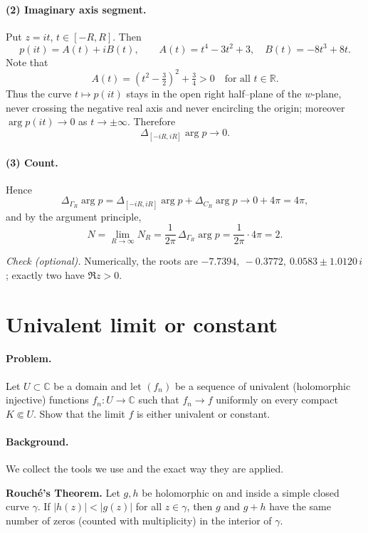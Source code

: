 \documentclass[12pt,a4paper]{article}
\begin{document}
\paragraph{(2) Imaginary axis segment.}
Put \(z=it\), \(t\in[-R,R]\). Then
\[
p(it)=A(t)+iB(t),\qquad
A(t)=t^4-3t^2+3,\quad B(t)=-8t^3+8t.
\]
Note that
\[
A(t)=(t^2-\tfrac{3}{2})^2+\tfrac{3}{4}>0\quad\text{for all }t\in\mathbb R.
\]
Thus the curve \(t\mapsto p(it)\) stays in the open right half–plane of the \(w\)-plane,
never crossing the negative real axis and never encircling the origin; moreover
\(\arg p(it)\to 0\) as \(t\to\pm\infty\).
Therefore
\[
\Delta_{[-iR,iR]}\arg p \longrightarrow 0.
\]

\paragraph{(3) Count.}
Hence
\[
\Delta_{\Gamma_R}\arg p
=\Delta_{[-iR,iR]}\arg p+\Delta_{C_R}\arg p
\longrightarrow 0+4\pi=4\pi,
\]
and by the argument principle,
\[
N=\lim_{R\to\infty} N_R
=\frac{1}{2\pi}\,\Delta_{\Gamma_R}\arg p
=\frac{1}{2\pi}\cdot 4\pi
=\boxed{2}.
\]

\medskip
\emph{Check (optional).} Numerically, the roots are
\(-7.7394,\ -0.3772,\ 0.0583\pm 1.0120\,i\); exactly two have \(\Re z>0\).

	
\section*{Univalent limit or constant}

\paragraph{Problem.}
Let $U\subset\mathbb C$ be a domain and let $(f_n)$ be a sequence of univalent
(holomorphic injective) functions $f_n:U\to\mathbb C$ such that
$f_n\to f$ uniformly on every compact $K\Subset U$.
Show that the limit $f$ is either univalent or constant.

\bigskip

\paragraph{Background.} We collect the tools we use and the exact way they are applied.

\medskip

\textbf{Rouch\'e's Theorem.}
Let $g,h$ be holomorphic on and inside a simple closed curve $\gamma$.
If $|h(z)|<|g(z)|$ for all $z\in\gamma$, then $g$ and $g+h$ have the same number
of zeros (counted with multiplicity) in the interior of $\gamma$.
\end{document}
